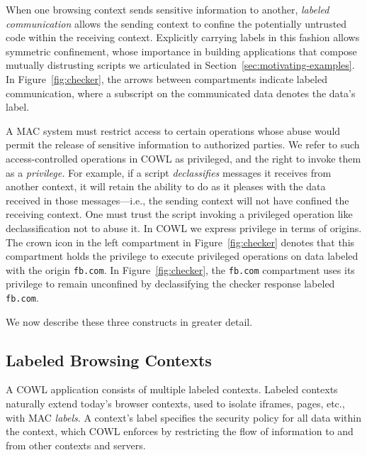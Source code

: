 When one browsing context sends sensitive information to another, {\em
  labeled communication} allows the sending context to confine the
potentially untrusted code within the receiving context. Explicitly
carrying labels in this fashion allows symmetric confinement, whose
importance in building applications that compose mutually distrusting
scripts we articulated in Section~\ref{sec:motivating-examples}. In
Figure~\ref{fig:checker}, the arrows between compartments indicate
labeled communication, where a subscript on the communicated data
denotes the data's label.

A MAC system must restrict access to certain operations whose abuse
would permit the release of sensitive information to authorized
parties. We refer to such access-controlled operations in COWL as
privileged, and the right to invoke them as a {\em privilege.} For
example, if a script {\em declassifies} messages it receives from
another context, it will retain the ability to do as it pleases with
the data received in those messages---i.e., the sending context will
not have confined the receiving context. One must trust the script
invoking a privileged operation like declassification not to abuse
it. In COWL we express privilege in terms of origins. The crown icon
in the left compartment in Figure~\ref{fig:checker} denotes that this
compartment holds the privilege to execute privileged operations on
data labeled with the origin {\tt fb.com}. In
Figure~\ref{fig:checker}, the {\tt fb.com} compartment uses its
privilege to remain unconfined by declassifying the checker response
labeled {\tt fb.com}.

We now describe these three constructs in greater detail.



\subsection{Labeled Browsing Contexts}
\label{sec:system:contexts}
A COWL application consists of multiple labeled contexts.
%
Labeled contexts naturally extend today's browser contexts, used to
isolate iframes, pages, etc., with MAC \emph{labels}.
%
A context's label specifies the security policy for all data within
the context, which COWL enforces by restricting the flow of
information to and from other contexts and servers.

